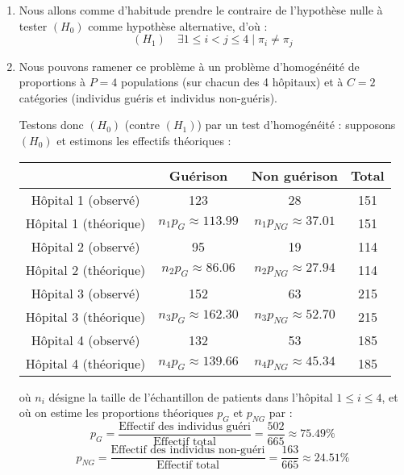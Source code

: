 \documentclass[a4paper,oneside,12pt]{article}
\theoremstyle{plain}
\begin{document}
\begin{enumerate}
    \item Nous allons comme d'habitude prendre le contraire de l'hypothèse nulle à tester $(H_0)$ comme hypothèse alternative, d'où :
    $$(H_1)\quad \exists 1\le i < j \le 4\; |\; \pi_i \neq \pi_j$$

    \item Nous pouvons ramener ce problème à un problème d'homogénéité de proportions à $P = 4$ populations (sur chacun des 4 hôpitaux) et à $C = 2$ catégories (individus guéris et individus non-guéris).

    Testons donc $(H_0)$ (contre $(H_1)$) par un test d'homogénéité : supposons $(H_0)$ et estimons les effectifs théoriques :
    \begin{table}[h]
        \centering
        \begin{tabular}{|c|c|c|c|}
            \hline
             & Guérison & Non guérison & Total \\
            \hline
            Hôpital 1 (observé) & 123 & 28 & 151\\
            \hline
            Hôpital 1 (théorique) & $n_1p_G \approx 113.99$ & $n_1p_{NG} \approx 37.01$ & 151\\
            \hline
            Hôpital 2 (observé) & 95 & 19 & 114\\
            \hline
            Hôpital 2 (théorique) & $n_2p_G \approx 86.06$ & $n_2p_{NG} \approx 27.94$ & 114\\
            \hline
            Hôpital 3 (observé) & 152 & 63 & 215\\
            \hline
            Hôpital 3 (théorique) & $n_3p_G \approx 162.30$ & $n_3p_{NG} \approx 52.70$ & 215\\
            \hline
            Hôpital 4 (observé) & 132 & 53 & 185\\
            \hline
            Hôpital 4 (théorique) & $n_4p_G \approx 139.66$ & $n_4p_{NG} \approx 45.34$ & 185\\
            \hline
        \end{tabular}
    \end{table}
    
    où $n_i$ désigne la taille de l'échantillon de patients dans l'hôpital $1\le i \le 4$, et où on estime les proportions théoriques $p_G$ et $p_{NG}$ par :
    $$p_G = \frac{\mbox{Effectif des individus guéri}}{\mbox{Effectif total}} = \frac{502}{665} \approx 75.49\%$$
    $$p_{NG} = \frac{\mbox{Effectif des individus non-guéri}}{\mbox{Effectif total}} = \frac{163}{665} \approx 24.51\%$$


\end{enumerate}
\end{document}
